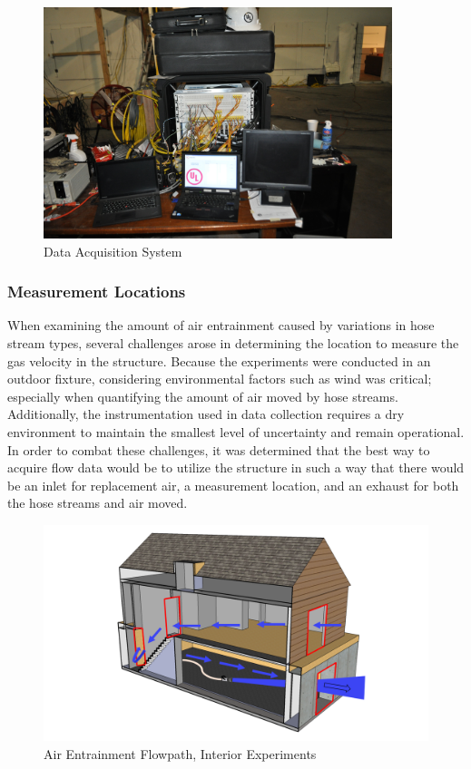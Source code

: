 \documentclass{article}
\begin{document}
\begin{figure}[H]
	\centering
	\includegraphics[width = 4in]{../0_Images/Instrumentation/DataSystem.jpg}
	\caption{Data Acquisition System}
	\label{fig:DataSystem}
\end{figure}

\clearpage

\subsubsection{Measurement Locations}

When examining the amount of air entrainment caused by variations in hose stream types, several challenges arose in determining the location to measure the gas velocity in the structure. Because the experiments were conducted in an outdoor fixture, considering environmental factors such as wind was critical; especially when quantifying the amount of air moved by hose streams. Additionally, the instrumentation used in data collection requires a dry environment to maintain the smallest level of uncertainty and remain operational. In order to combat these challenges, it was determined that the best way to acquire flow data would be to utilize the structure in such a way that there would be an inlet for replacement air, a measurement location, and an exhaust for both the hose streams and air moved. 

\begin{figure}[!ht]
	\centering
	\includegraphics[width=5in]{Figures/Air_Entrainment/Airflow_Layout.png}
	\caption{Air Entrainment Flowpath, Interior Experiments}
	\label{fig:Air_Entrainment_Flowpath_Interior_Experiments}
\end{figure}
\end{document}
